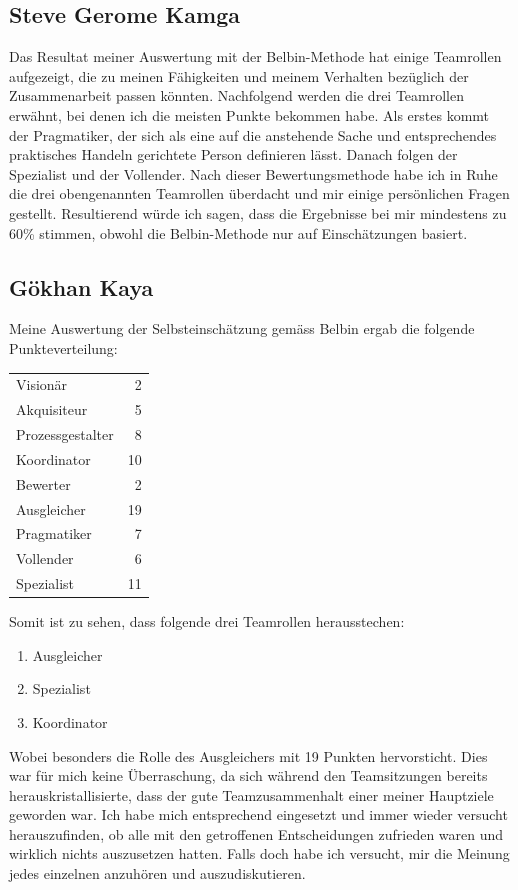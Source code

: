 \subsection*{Steve Gerome Kamga}
Das Resultat meiner Auswertung mit der Belbin-Methode hat einige Teamrollen aufgezeigt, die zu meinen Fähigkeiten und meinem Verhalten bezüglich der Zusammenarbeit passen könnten. Nachfolgend werden die drei Teamrollen erwähnt, bei denen ich die meisten Punkte bekommen habe.
Als erstes kommt der Pragmatiker, der sich als eine auf die anstehende Sache und entsprechendes praktisches Handeln gerichtete Person definieren lässt. Danach folgen der Spezialist und der Vollender.
\newline
Nach dieser Bewertungsmethode habe ich in Ruhe die drei obengenannten Teamrollen überdacht und mir einige persönlichen Fragen gestellt. Resultierend würde ich sagen, dass die Ergebnisse bei mir mindestens zu 60\% stimmen, obwohl die Belbin-Methode nur auf Einschätzungen basiert.


\subsection*{Gökhan Kaya}

Meine Auswertung der Selbsteinschätzung gemäss Belbin ergab die folgende Punkteverteilung:

\begin{tabular}{lr}
  Visionär & 2 \\ 
  Akquisiteur & 5 \\ 
  Prozessgestalter & 8 \\ 
  Koordinator & 10 \\ 
  Bewerter & 2 \\
  Ausgleicher & 19 \\
  Pragmatiker & 7 \\
  Vollender & 6 \\
  Spezialist & 11 \\
\end{tabular}
\newline


Somit ist zu sehen, dass folgende drei Teamrollen herausstechen:
\begin{enumerate} 
\item Ausgleicher 
\item Spezialist
\item Koordinator
\end{enumerate}

Wobei besonders die Rolle des Ausgleichers mit 19 Punkten hervorsticht. Dies war für mich keine Überraschung, da sich während den Teamsitzungen bereits herauskristallisierte, dass der gute Teamzusammenhalt einer meiner Hauptziele geworden war. Ich habe mich entsprechend eingesetzt und immer wieder versucht herauszufinden, ob alle mit den getroffenen Entscheidungen zufrieden waren und wirklich nichts auszusetzen hatten. Falls doch habe ich versucht, mir die Meinung jedes einzelnen anzuhören und auszudiskutieren.

